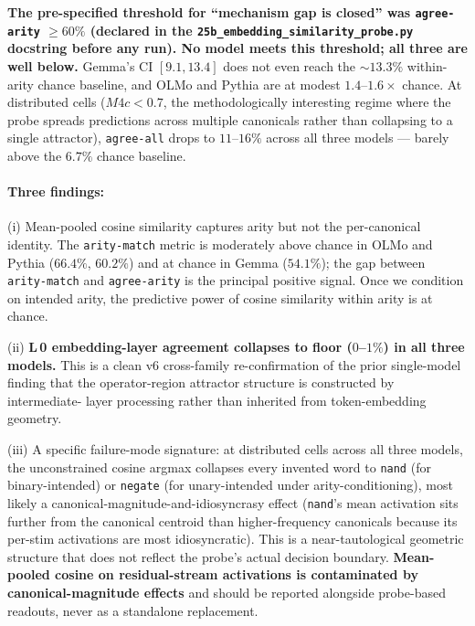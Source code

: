 \documentclass[11pt,letterpaper]{article}
\newcommand{\Mbfc}{M4c}
\begin{document}
\textbf{The pre-specified threshold for ``mechanism gap is closed''
was \texttt{agree-arity} $\geq 60\%$ (declared in the
\texttt{25b\_embedding\_similarity\_probe.py} docstring before any
run). No model meets this threshold; all three are well below.}
Gemma's CI $[9.1, 13.4]$ does not even reach the ${\sim}13.3\%$
within-arity chance baseline, and OLMo and Pythia are at modest
$1.4$--$1.6\times$ chance. At distributed cells ($\Mbfc < 0.7$, the
methodologically interesting regime where the probe spreads
predictions across multiple canonicals rather than collapsing to a
single attractor), \texttt{agree-all} drops to $11$--$16\%$ across
all three models --- barely above the $6.7\%$ chance baseline.

\paragraph{Three findings:}

(i) Mean-pooled cosine similarity captures arity but not the
per-canonical identity. The \texttt{arity-match} metric is
moderately above chance in OLMo and Pythia ($66.4\%$, $60.2\%$) and
at chance in Gemma ($54.1\%$); the gap between
\texttt{arity-match} and \texttt{agree-arity} is the principal
positive signal. Once we condition on intended arity, the predictive
power of cosine similarity within arity is at chance.

(ii) \textbf{L\,0 embedding-layer agreement collapses to floor
($0$--$1\%$) in all three models.} This is a clean v6 cross-family
re-confirmation of the prior single-model finding that the
operator-region attractor structure is constructed by intermediate-
layer processing rather than inherited from token-embedding geometry.

(iii) A specific failure-mode signature: at distributed cells across
all three models, the unconstrained cosine argmax collapses every
invented word to \texttt{nand} (for binary-intended) or
\texttt{negate} (for unary-intended under arity-conditioning), most
likely a canonical-magnitude-and-idiosyncrasy effect
(\texttt{nand}'s mean activation sits further from the canonical
centroid than higher-frequency canonicals because its per-stim
activations are most idiosyncratic). This is a near-tautological
geometric structure that does not reflect the probe's actual
decision boundary. \textbf{Mean-pooled cosine on residual-stream
activations is contaminated by canonical-magnitude effects} and
should be reported alongside probe-based readouts, never as a
standalone replacement.
\end{document}
